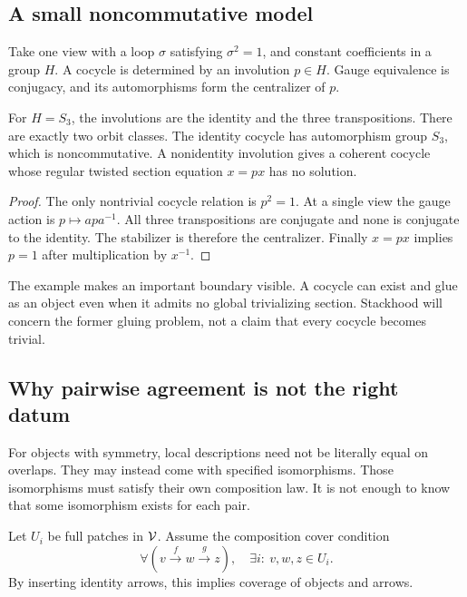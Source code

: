 \subsection{A small noncommutative model}
\begin{example}\label{KS33}
Take one view with a loop \(\sigma\) satisfying \(\sigma^2=1\), and constant coefficients in a group \(H\). A cocycle is determined by an involution \(p\in H\). Gauge equivalence is conjugacy, and its automorphisms form the centralizer of \(p\).

For \(H=S_3\), the involutions are the identity and the three transpositions. There are exactly two orbit classes. The identity cocycle has automorphism group \(S_3\), which is noncommutative. A nonidentity involution gives a coherent cocycle whose regular twisted section equation \(x=px\) has no solution.
\end{example}
\begin{proof}
The only nontrivial cocycle relation is \(p^2=1\). At a single view the gauge action is \(p\mapsto apa^{-1}\). All three transpositions are conjugate and none is conjugate to the identity. The stabilizer is therefore the centralizer. Finally \(x=px\) implies \(p=1\) after multiplication by \(x^{-1}\).
\end{proof}
The example makes an important boundary visible. A cocycle can exist and glue as an object even when it admits no global trivializing section. Stackhood will concern the former gluing problem, not a claim that every cocycle becomes trivial.


\label{sec:descent}
\subsection{Why pairwise agreement is not the right datum}
For objects with symmetry, local descriptions need not be literally equal on overlaps. They may instead come with specified isomorphisms. Those isomorphisms must satisfy their own composition law. It is not enough to know that some isomorphism exists for each pair.

Let \(U_i\) be full patches in \(\mathcal V\). Assume the composition cover condition
\begin{equation}\label{eq:compositioncover}
 \forall(v\xrightarrow f w\xrightarrow g z),\quad
 \exists i:\ v,w,z\in U_i.
\end{equation}
By inserting identity arrows, this implies coverage of objects and arrows.

